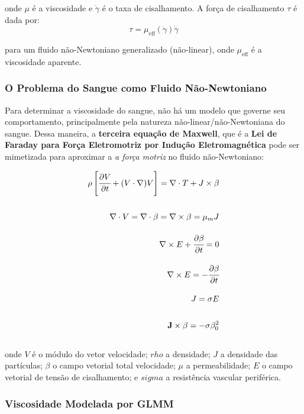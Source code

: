 \documentclass[a4paper,12pt]{article}
\begin{document}
onde $\mu$ é a viscosidade e $\dot \gamma$ é o taxa de cisalhamento. A força de cisalhamento $\tau$ é dada por: \\

\begin{equation*}
    \tau = \mu_{\text{eff}} (\dot \gamma) \dot \gamma
\end{equation*}

para um fluido não-Newtoniano generalizado (não-linear), onde $\mu_{\text{eff}}$ é a viscosidade aparente. \\

\subsubsection*{O Problema do Sangue como Fluido Não-Newtoniano}

Para determinar a viscosidade do sangue, não há um modelo que governe seu comportamento, principalmente pela natureza não-linear/não-Newtoniana do sangue. Dessa maneira, a \textbf{terceira equação de Maxwell}, que é a \textbf{Lei de Faraday para Força Eletromotriz por Indução Eletromagnética} pode ser mimetizada para aproximar a \emph{a força motriz} no fluido não-Newtoniano:

\begin{align*}
    \rho \left [ \cfrac{\partial V}{\partial t} + (V \cdot \nabla)V \right] =           \nabla \cdot T + J \times \beta& \\[16pt]
    \nabla \cdot V = \nabla \cdot \beta = \nabla \times \beta = \mu_m J& \\[10pt]
    \nabla \times E + \cfrac{\partial \beta}{\partial t} = 0& \\[10pt]
    \nabla \times E = - \cfrac{\partial \beta}{\partial t}& \\[10pt]
    J = \sigma E& \\[16pt]
    \mathbf{J} \times \beta = -\sigma \beta_0^2
\end{align*} \\
onde $V$ é o módulo do vetor velocidade; $rho$ a densidade; $J$ a densidade das partículas; $\beta$ o campo vetorial total velocidade; $\mu$ a permeabilidade; $E$ o campo vetorial de tensão de cisalhamento; e $sigma$ a resistência vascular periférica. \\

\newpage
\subsubsection*{Viscosidade Modelada por GLMM}
\end{document}

